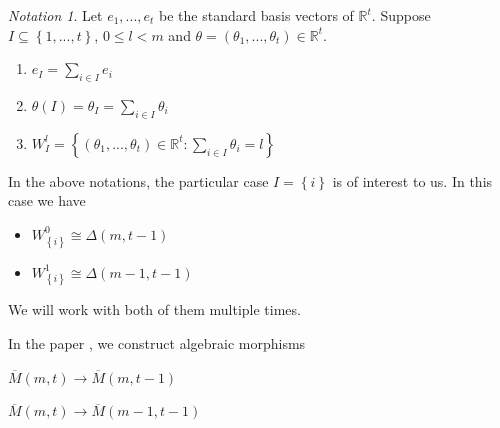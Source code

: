 \documentclass[12pt, reqno]{amsart}
\theoremstyle{definition}
\theoremstyle{remark}
\numberwithin{equation}{section}
\newtheorem{notation}{Notation}[section]
\begin{document}
\begin{notation}
	
	
	Let $e_1,...,e_t$ be the standard basis vectors of $\mathbb{R}^t$. Suppose $I\subseteq \left\{1,...,t\right\}$, $0\leq l<m$ and $\theta=(\theta_1,...,\theta_t) \in \mathbb{R}^t$.
	\begin{center}
		\begin{enumerate}
			\item 
			$e_I=\sum\limits_{i\in I} e_{i}$ 
			
			
			\item 
			$\theta(I)=\theta_I=\sum\limits_{i\in I} \theta_{i}$ 
			\item 
			$W^l_I=\left\{(\theta_1,...,\theta_t)\in \mathbb{R}^t : \sum\limits_{i\in I} \theta_{i}=l \right\}$ 
			
			
			
		\end{enumerate}
	\end{center}
\end{notation}


In the above notations, the  particular case  $I=\left\{i \right\}$ is of interest to us. In this case  we have

\begin{center}
	\begin{itemize}
		\item 
			$W^0_{\left\{i\right\}} \cong \Delta(m,t-1)$
			\item 
		$W^1_{\left\{i\right\}} \cong \Delta(m-1,t-1)$
		\end{itemize}
\end{center}
We will work with both of them multiple times.


  In the paper 
\cite{HHH}, we construct algebraic morphisms 


\begin{center}
	$
	\overline{M}(m, t) \longrightarrow \overline{M}(m, t-1)
	$
	
	
	$
	\overline{M}(m, t) \longrightarrow \overline{M}(m-1, t-1)
	$
	
	
\end{center}
\end{document}
